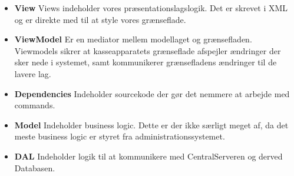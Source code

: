 \begin{itemize}
	\item \textbf{View} Views indeholder vores præsentationslagslogik. Det er skrevet i XML og er direkte med til at style vores grænseflade.
	\item \textbf{ViewModel} Er en mediator mellem modellaget og grænsefladen. Viewmodels sikrer at kasseapparatets grænseflade afspejler ændringer der sker nede i systemet, samt kommunikerer grænsefladens ændringer til de lavere lag.
	\item \textbf{Dependencies} Indeholder sourcekode der gør det nemmere at arbejde med commands.
	\item \textbf{Model} Indeholder business logic. Dette er der ikke særligt meget af, da det meste business logic er styret fra administrationssystemet.
	\item \textbf{DAL} Indeholder logik til at kommunikere med CentralServeren og derved Databasen.
\end{itemize}

